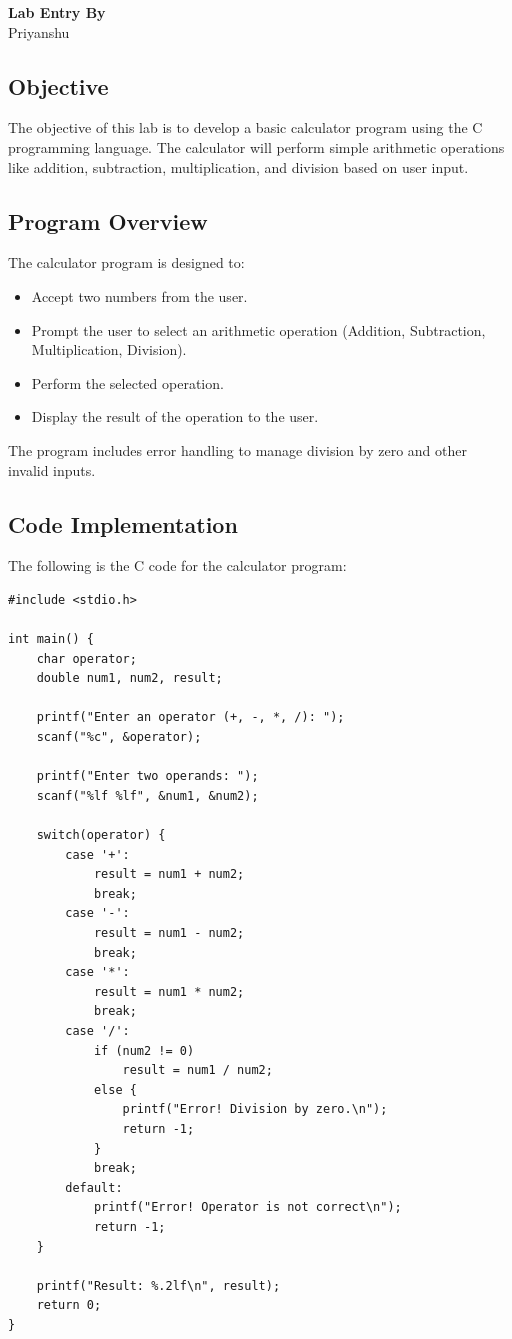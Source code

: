 \documentclass{article}
\begin{document}
\begin{center}
    \textbf{Lab Entry By}\\
    Priyanshu
\end{center}

\subsection{Objective}
The objective of this lab is to develop a basic calculator program using the C programming language. The calculator will perform simple arithmetic operations like addition, subtraction, multiplication, and division based on user input.

\subsection{Program Overview}
The calculator program is designed to:
\begin{itemize}
    \item Accept two numbers from the user.
    \item Prompt the user to select an arithmetic operation (Addition, Subtraction, Multiplication, Division).
    \item Perform the selected operation.
    \item Display the result of the operation to the user.
\end{itemize}

The program includes error handling to manage division by zero and other invalid inputs.

\subsection{Code Implementation}
The following is the C code for the calculator program:

\begin{verbatim}
#include <stdio.h>

int main() {
    char operator;
    double num1, num2, result;

    printf("Enter an operator (+, -, *, /): ");
    scanf("%c", &operator);

    printf("Enter two operands: ");
    scanf("%lf %lf", &num1, &num2);

    switch(operator) {
        case '+':
            result = num1 + num2;
            break;
        case '-':
            result = num1 - num2;
            break;
        case '*':
            result = num1 * num2;
            break;
        case '/':
            if (num2 != 0)
                result = num1 / num2;
            else {
                printf("Error! Division by zero.\n");
                return -1;
            }
            break;
        default:
            printf("Error! Operator is not correct\n");
            return -1;
    }

    printf("Result: %.2lf\n", result);
    return 0;
}
\end{verbatim}
\end{document}
